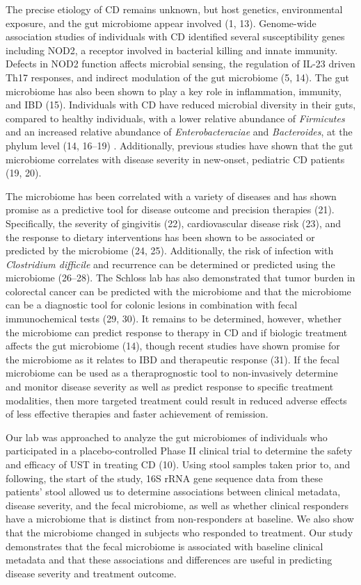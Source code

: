 \documentclass[11pt,]{article}
\begin{document}
The precise etiology of CD remains unknown, but host genetics,
environmental exposure, and the gut microbiome appear involved (1, 13).
Genome-wide association studies of individuals with CD identified
several susceptibility genes including NOD2, a receptor involved in
bacterial killing and innate immunity. Defects in NOD2 function affects
microbial sensing, the regulation of IL-23 driven Th17 responses, and
indirect modulation of the gut microbiome (5, 14). The gut microbiome
has also been shown to play a key role in inflammation, immunity, and
IBD (15). Individuals with CD have reduced microbial diversity in their
guts, compared to healthy individuals, with a lower relative abundance
of \emph{Firmicutes} and an increased relative abundance of
\emph{Enterobacteraciae} and \emph{Bacteroides}, at the phylum level
(14, 16--19) . Additionally, previous studies have shown that the gut
microbiome correlates with disease severity in new-onset, pediatric CD
patients (19, 20).

The microbiome has been correlated with a variety of diseases and has
shown promise as a predictive tool for disease outcome and precision
therapies (21). Specifically, the severity of gingivitis (22),
cardiovascular disease risk (23), and the response to dietary
interventions has been shown to be associated or predicted by the
microbiome (24, 25). Additionally, the risk of infection with
\emph{Clostridium difficile} and recurrence can be determined or
predicted using the microbiome (26--28). The Schloss lab has also
demonstrated that tumor burden in colorectal cancer can be predicted
with the microbiome and that the microbiome can be a diagnostic tool for
colonic lesions in combination with fecal immunochemical tests (29, 30).
It remains to be determined, however, whether the microbiome can predict
response to therapy in CD and if biologic treatment affects the gut
microbiome (14), though recent studies have shown promise for the
microbiome as it relates to IBD and therapeutic response (31). If the
fecal microbiome can be used as a theraprognostic tool to non-invasively
determine and monitor disease severity as well as predict response to
specific treatment modalities, then more targeted treatment could result
in reduced adverse effects of less effective therapies and faster
achievement of remission.

Our lab was approached to analyze the gut microbiomes of individuals who
participated in a placebo-controlled Phase II clinical trial to
determine the safety and efficacy of UST in treating CD (10). Using
stool samples taken prior to, and following, the start of the study, 16S
rRNA gene sequence data from these patients' stool allowed us to
determine associations between clinical metadata, disease severity, and
the fecal microbiome, as well as whether clinical responders have a
microbiome that is distinct from non-responders at baseline. We also
show that the microbiome changed in subjects who responded to treatment.
Our study demonstrates that the fecal microbiome is associated with
baseline clinical metadata and that these associations and differences
are useful in predicting disease severity and treatment outcome.
\end{document}
